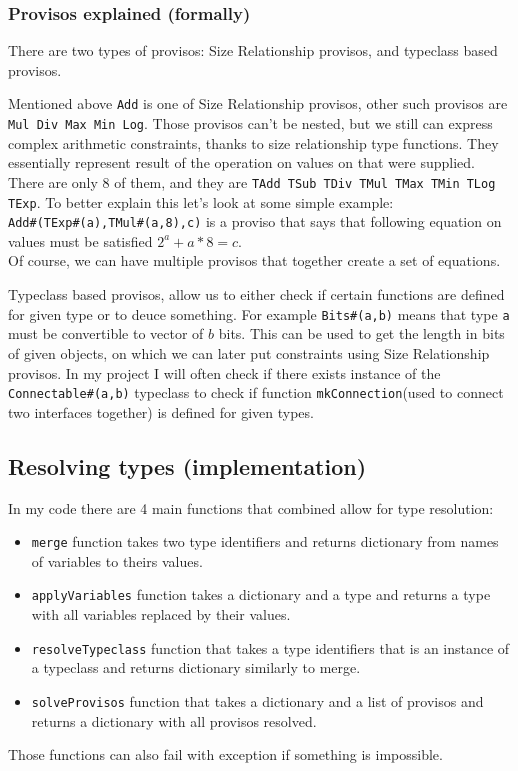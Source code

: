 \documentclass[14pt]{report}
\begin{document}
\subsubsection*{Provisos explained (formally)}
There are two types of provisos: Size Relationship provisos, and typeclass based provisos.

Mentioned above \verb!Add! is one of Size Relationship provisos, other such provisos are \verb!Mul Div Max Min Log!. Those provisos can't be nested, but we still can express complex arithmetic constraints, thanks to size relationship type functions. They essentially represent result of the operation on values on that were supplied. There are only 8 of them, and they are \verb!TAdd TSub TDiv TMul TMax TMin TLog TExp!.
To better explain this let's look at some simple example: \\
\verb!Add#(TExp#(a),TMul#(a,8),c)! is a proviso that says that following equation on values must be satisfied $2^a+a*8 = c$. \\
Of course, we can have multiple provisos that together create a set of equations. 

Typeclass based provisos, allow us to either check if certain functions are defined for given type or to deuce something. For example \verb!Bits#(a,b)! means that type \verb!a! must be convertible to vector of $b$ bits. This can be used to get the length in bits of given objects, on which we can later put constraints using Size Relationship provisos.
In my project I will often check if there exists instance of the \verb!Connectable#(a,b)! typeclass to check if function \verb!mkConnection!(used to connect two interfaces together) is defined for given types.

\subsection{Resolving types (implementation)}
In my code there are 4 main functions that combined allow for type resolution:
\begin{itemize}
    \item \verb!merge! function takes two type identifiers and returns dictionary from names of variables to theirs values.
    \item \verb!applyVariables! function takes a dictionary and a type and returns a type with all variables replaced by their values.
    \item \verb!resolveTypeclass! function that takes a type identifiers that is an instance of a typeclass and returns dictionary similarly to merge.
    \item \verb!solveProvisos! function that takes a dictionary and a list of provisos and returns a dictionary with all provisos resolved.
\end{itemize}
Those functions can also fail with exception if something is impossible.
\end{document}
